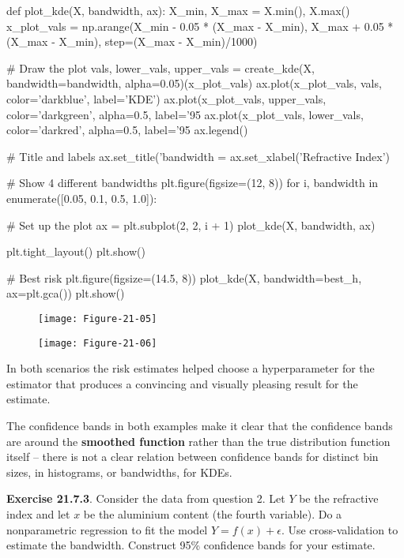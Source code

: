 \begin{python}
def plot_{k}de(X, bandwidth, ax):
    X_min, X_max = X.min(), X.max()
    x_plot_vals = np.arange(X_min - 0.05 * (X_max - X_min), X_max + 0.05 * (X_max - X_min), step=(X_max - X_min)/1000)
      
    # Draw the plot
    vals, lower_vals, upper_vals = create_{k}de(X, bandwidth=bandwidth, alpha=0.05)(x_plot_vals)
    ax.plot(x_plot_vals, vals, color='darkblue', label='KDE')
    ax.plot(x_plot_vals, upper_vals, color='darkgreen', alpha=0.5, label='95%
    ax.plot(x_plot_vals, lower_vals, color='darkred', alpha=0.5, label='95%
    ax.legend()
    
    # Title and labels
    ax.set_title('bandwidth = %
    ax.set_xlabel('Refractive Index')    

# Show 4 different bandwidths
plt.figure(figsize=(12, 8))
for i, bandwidth in enumerate([0.05, 0.1, 0.5, 1.0]):
    
    # Set up the plot
    ax = plt.subplot(2, 2, i + 1)
    plot_{k}de(X, bandwidth, ax)

plt.tight_layout()
plt.show()

# Best risk
plt.figure(figsize=(14.5, 8))
plot_{k}de(X, bandwidth=best_h, ax=plt.gca())
plt.show()
\end{python}

\begin{figure}[H]
\centering
\texttt{[image: Figure-21-05]}
\end{figure}

\begin{figure}[H]
\centering
\texttt{[image: Figure-21-06]}
\end{figure}

In both scenarios the risk estimates helped choose a hyperparameter for
the estimator that produces a convincing and visually pleasing result
for the estimate.

The confidence bands in both examples make it clear that the confidence
bands are around the \textbf{smoothed function} rather than the true
distribution function itself -- there is not a clear relation between
confidence bands for distinct bin sizes, in histograms, or bandwidths,
for KDEs.

\textbf{Exercise 21.7.3}. Consider the data from question 2. Let \(Y\)
be the refractive index and let \(x\) be the aluminium content (the
fourth variable). Do a nonparametric regression to fit the model
\(Y = f(x) + \epsilon\). Use cross-validation to estimate the bandwidth.
Construct 95\% confidence bands for your estimate.

